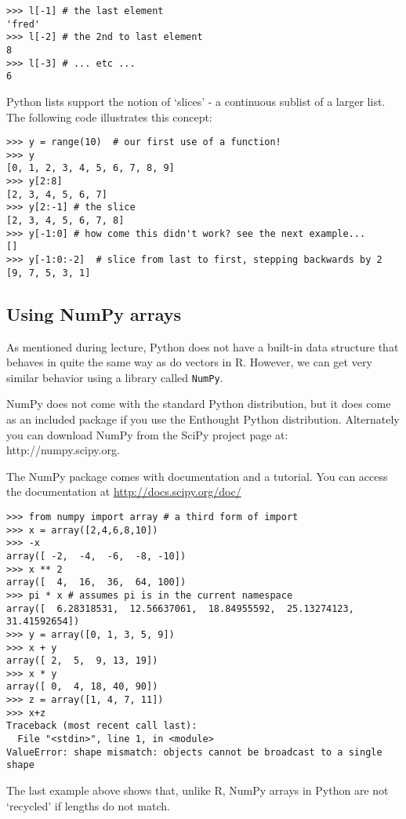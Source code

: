 \begin{lstlisting}
>>> l[-1] # the last element
'fred'
>>> l[-2] # the 2nd to last element
8
>>> l[-3] # ... etc ...
6
\end{lstlisting}
Python lists support the notion of `slices' - a continuous sublist of a
larger list. The following code illustrates this concept:

\begin{lstlisting}
>>> y = range(10)  # our first use of a function!
>>> y
[0, 1, 2, 3, 4, 5, 6, 7, 8, 9]
>>> y[2:8]
[2, 3, 4, 5, 6, 7]
>>> y[2:-1] # the slice
[2, 3, 4, 5, 6, 7, 8]
>>> y[-1:0] # how come this didn't work? see the next example...
[]
>>> y[-1:0:-2]  # slice from last to first, stepping backwards by 2
[9, 7, 5, 3, 1]
\end{lstlisting}
\subsection{Using NumPy arrays}

As mentioned during lecture, Python does not have a built-in data
structure that behaves in quite the same way as do vectors in R.
However, we can get very similar behavior using a library called
\lstinline!NumPy!.

NumPy does not come with the standard Python distribution, but it does
come as an included package if you use the Enthought Python
distribution. Alternately you can download NumPy from the SciPy project
page at: http://numpy.scipy.org.

The NumPy package comes with documentation and a tutorial. You can
access the documentation at \url{http://docs.scipy.org/doc/}

\begin{lstlisting}
>>> from numpy import array # a third form of import 
>>> x = array([2,4,6,8,10])
>>> -x
array([ -2,  -4,  -6,  -8, -10])
>>> x ** 2
array([  4,  16,  36,  64, 100])
>>> pi * x # assumes pi is in the current namespace
array([  6.28318531,  12.56637061,  18.84955592,  25.13274123,  31.41592654])
>>> y = array([0, 1, 3, 5, 9])
>>> x + y
array([ 2,  5,  9, 13, 19])
>>> x * y
array([ 0,  4, 18, 40, 90])
>>> z = array([1, 4, 7, 11])
>>> x+z
Traceback (most recent call last):
  File "<stdin>", line 1, in <module>
ValueError: shape mismatch: objects cannot be broadcast to a single shape
\end{lstlisting}
The last example above shows that, unlike R, NumPy arrays in Python are
not `recycled' if lengths do not match.

